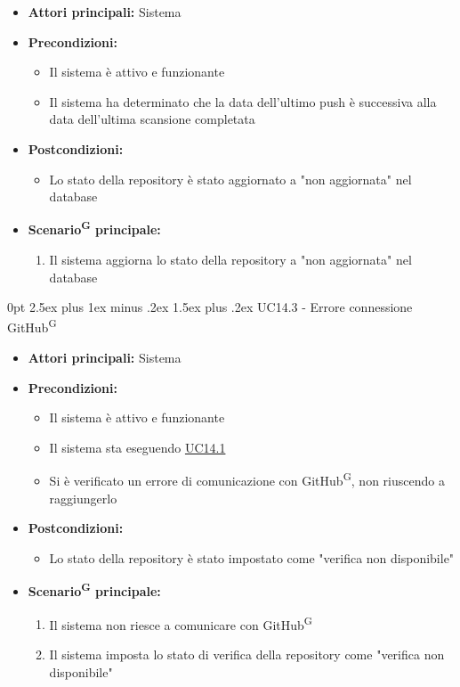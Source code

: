 \documentclass[a4paper, 11pt]{article}
\makeatletter
\renewcommand\paragraph{\@startsection{paragraph}{4}
  {0pt}
  {2.5ex plus 1ex minus .2ex}
  {1.5ex plus .2ex}
  {\normalfont\normalsize\bfseries\color{AccentDark}}}
\makeatother
\begin{document}
\begin{itemize}
	\item \textbf{Attori principali:} Sistema
	\item \textbf{Precondizioni:}
	\begin{itemize}
		\item Il sistema è attivo e funzionante
		\item Il sistema ha determinato che la data dell'ultimo push è successiva alla data dell'ultima scansione completata
	\end{itemize}
	\item \textbf{Postcondizioni:}
	\begin{itemize}
		\item Lo stato della repository è stato aggiornato a "non aggiornata" nel database
	\end{itemize}
	\item \textbf{Scenario\textsuperscript{G} principale:}
	\begin{enumerate}
		\item Il sistema aggiorna lo stato della repository a "non aggiornata" nel database
	\end{enumerate}
\end{itemize}


\paragraph{UC14.3 - Errore connessione GitHub\textsuperscript{G}} \label{UC14.3}

\begin{itemize}
	\item \textbf{Attori principali:} Sistema
	\item \textbf{Precondizioni:}
	\begin{itemize}
		\item Il sistema è attivo e funzionante
		\item Il sistema sta eseguendo \hyperref[UC14.1]{UC14.1}
		\item Si è verificato un errore di comunicazione con GitHub\textsuperscript{G}, non riuscendo a raggiungerlo
	\end{itemize}
	\item \textbf{Postcondizioni:}
	\begin{itemize}
		\item Lo stato della repository è stato impostato come "verifica non disponibile"
	\end{itemize}
	\item \textbf{Scenario\textsuperscript{G} principale:}
	\begin{enumerate}
		\item Il sistema non riesce a comunicare con GitHub\textsuperscript{G}
		\item Il sistema imposta lo stato di verifica della repository come "verifica non disponibile"
	\end{enumerate}
\end{itemize}
\end{document}

